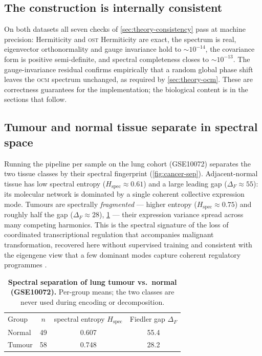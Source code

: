 \documentclass[preprint,12pt,amsmath,amssymb,superscriptaddress,floatfix]{revtex4-2}
\theoremstyle{definition}
\theoremstyle{plain}
\newcommand{\OCM}{\textsc{ocm}}
\newcommand{\OST}{\textsc{ost}}
\newcommand{\Hspec}{H_{\mathrm{spec}}}
\begin{document}
\subsection{The construction is internally consistent}
\label{sec:res-consistency}

On both datasets all seven checks of \cref{sec:theory-consistency} pass at
machine precision: Hermiticity and \OST{} Hermiticity are exact, the spectrum is
real, eigenvector orthonormality and gauge invariance hold to $\sim10^{-14}$, the
covariance form is positive semi-definite, and spectral completeness closes to
$\sim10^{-13}$. The gauge-invariance residual confirms empirically that a random
global phase shift leaves the \OCM{} spectrum unchanged, as required by
\cref{sec:theory-ocm}. These are correctness guarantees for the implementation;
the biological content is in the sections that follow.

\subsection{Tumour and normal tissue separate in spectral space}
\label{sec:res-cancer}

Running the pipeline per sample on the lung cohort (GSE10072) separates the two
tissue classes by their spectral fingerprint (\cref{fig:cancer-sep}).
Adjacent-normal tissue has low spectral entropy ($\Hspec\approx0.61$) and a large
leading gap ($\Delta_F\approx55$): its molecular network is dominated by a single
coherent collective expression mode. Tumours are spectrally \emph{fragmented} ---
higher entropy ($\Hspec\approx0.75$) and roughly half the gap
($\Delta_F\approx28$), \cref{tab:cancer} --- their expression variance spread
across many competing harmonics. This is the spectral signature of the loss of
coordinated transcriptional regulation that accompanies malignant transformation,
recovered here without supervised training and consistent with the eigengene view
that a few dominant modes capture coherent regulatory programmes
\citep{alter2000svd}.

\begin{table}[htbp]
\centering
\caption{\textbf{Spectral separation of lung tumour vs.\ normal (GSE10072).}
Per-group means; the two classes are never used during encoding or decomposition.}
\label{tab:cancer}
\small
\begin{ruledtabular}
\begin{tabular}{lccc}
Group & $n$ & spectral entropy $\Hspec$ & Fiedler gap $\Delta_F$ \\
\colrule
Normal & 49 & 0.607 & 55.4 \\
Tumour & 58 & 0.748 & 28.2 \\
\end{tabular}
\end{ruledtabular}
\end{table}
\end{document}
